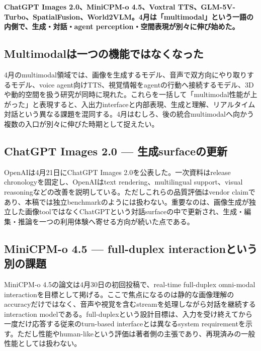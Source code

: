 \noindent\textbf{ChatGPT Images 2.0、MiniCPM-o 4.5、Voxtral TTS、GLM-5V-Turbo、SpatialFusion、World2VLM。4月は「multimodal」という一語の内側で、生成・対話・agent perception・空間表現が別々に伸び始めた。}\autocite{src-0f697d747d9c,src-d113b486a585,src-d33ba68aac3c,src-d8b7c1c36830}

\subsection{Multimodalは一つの機能ではなくなった}

4月のmultimodal領域では、画像を生成するモデル、音声で双方向にやり取りするモデル、voice agent向けTTS、視覚情報をagentの行動へ接続するモデル、3Dや動的空間を扱う研究が同時に現れた。これらを一括して「multimodal性能が上がった」と表現すると、入出力interfaceと内部表現、生成と理解、リアルタイム対話という異なる課題を混同する。4月はむしろ、後の統合multimodalへ向かう複数の入口が別々に伸びた時期として捉えたい。\autocite{src-0f697d747d9c,src-3fa7f7c1140f,src-d113b486a585,src-d33ba68aac3c,src-d8b7c1c36830,src-fec81b98fdc8}


\subsection{ChatGPT Images 2.0 — 生成surfaceの更新}

OpenAIは4月21日にChatGPT Images 2.0を公表した。一次資料はrelease chronologyを固定し、OpenAIはtext rendering、multilingual support、visual reasoningなどの改善を説明している。ただしこれらの品質評価はvendor claimであり、本稿では独立benchmarkのようには扱わない。重要なのは、画像生成が独立した画像toolではなくChatGPTという対話surfaceの中で更新され、生成・編集・推論を一つの利用体験へ寄せる方向が続いた点である。\autocite{src-0f697d747d9c}


\subsection{MiniCPM-o 4.5 — full-duplex interactionという別の課題}

MiniCPM-o 4.5の論文は4月30日の初回投稿で、real-time full-duplex omni-modal interactionを目標として掲げる。ここで焦点になるのは静的な画像理解のaccuracyだけではなく、音声や視覚を含むstreamを処理しながら対話を継続するinteraction modelである。full-duplexという設計目標は、入力を受け終えてから一度だけ応答する従来のturn-based interfaceとは異なるsystem requirementを示す。ただし性能やhuman-likeという評価は著者側の主張であり、再現済みの一般性能としては扱わない。\autocite{src-d33ba68aac3c}


